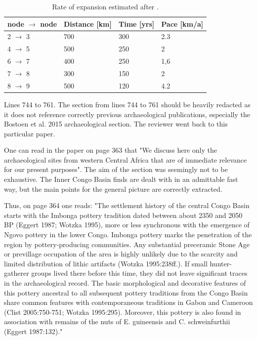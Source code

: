 \begin{reviewer}
\begin{table}[!tb]
	\centering
	{\small \begin{tabular}{llll}
			\toprule
			\textbf{node $\rightarrow$ node} & \textbf{Distance {[}km{]}} & \textbf{Time {[}yrs{]}} & \textbf{Pace {[}km/a{]}} \\
			\midrule
			2 $\rightarrow$ 3       & 700               & 300            & 2.3             \\
			4 $\rightarrow$ 5       & 500               & 250            & 2               \\
			6 $\rightarrow$ 7       & 400               & 250            & 1,6             \\
			7 $\rightarrow$ 8       & 300               & 150            & 2               \\
			8 $\rightarrow$ 9       & 500               & 120            & 4.2             \\
			\bottomrule
	\end{tabular}}
	\caption{Rate of expansion estimated after \citet[Fig. 1--2]{Grollemund.2015}.}
	\label{tab:pace_grollemund}	
\end{table}

\point Lines 744 to 761. The section from lines 744 to 761 should be heavily redacted as it does not reference correctly previous archaeological publications, especially the Bostoen et al. 2015 archaeological section. The reviewer went back to this particular paper.

One can read in the paper on page 363 that "We discuss here only the archaeological sites from western Central Africa that are of immediate relevance for our present purposes". The aim of the section was seemingly not to be exhaustive. The Inner Congo Basin finds are dealt with in an admittable fast way, but the main points for the general picture are correctly extracted.

Thus, on page 364 one reads: "The settlement history of the central Congo Basin starts with the Imbonga pottery tradition dated between about 2350 and 2050 BP (Eggert 1987; Wotzka 1995), more or less synchronous with the emergence of Ngovo pottery in the lower Congo. Imbonga pottery marks the penetration of the region by pottery-producing communities. Any substantial preceramic Stone Age or previllage occupation of the area is highly unlikely due to the scarcity and limited distribution of lithic artifacts (Wotzka 1995:238ff.). If small hunter-gatherer groups lived there before this time, they did not leave significant traces in the archaeological record. The basic morphological and decorative features of this pottery ancestral to all subsequent pottery traditions from the Congo Basin share common features with contemporaneous traditions in Gabon and Cameroon (Clist 2005:750-751; Wotzka 1995:295). Moreover, this pottery is also found in association with remains of the nuts of E. guineensis and C. schweinfurthii (Eggert 1987:132)."


\end{reviewer}
